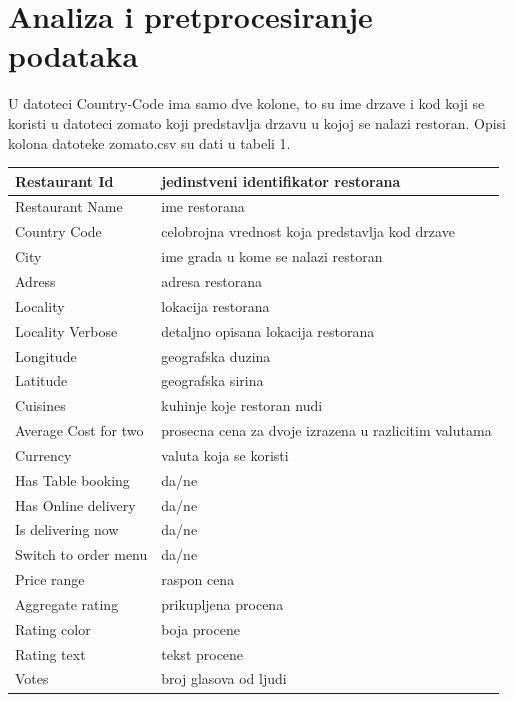 \documentclass[11pt]{article} %
\begin{document}
\section{Analiza i pretprocesiranje podataka}
U datoteci Country-Code ima samo dve kolone, to su ime drzave i kod koji se koristi u datoteci zomato koji predstavlja drzavu u kojoj se nalazi restoran. Opisi kolona datoteke zomato.csv su dati u tabeli 1.
\newline\newline
\begin{tabular}{|l|l|}
\hline
Restaurant Id & jedinstveni identifikator restorana \\
\hline
Restaurant Name & ime restorana \\
\hline
Country Code & celobrojna vrednost koja predstavlja kod drzave \\
\hline
City & ime grada u kome se nalazi restoran \\
\hline
Adress & adresa restorana \\
\hline
Locality & lokacija restorana \\
\hline
Locality Verbose & detaljno opisana lokacija restorana\\
\hline
Longitude & geografska duzina \\
\hline
Latitude & geografska sirina \\
\hline
Cuisines & kuhinje koje restoran nudi \\
\hline
Average Cost for two & prosecna cena za dvoje izrazena u razlicitim valutama \\
\hline
Currency & valuta koja se koristi \\
\hline
Has Table booking & da/ne \\
\hline
Has Online delivery & da/ne \\
\hline
Is delivering now & da/ne \\
\hline
Switch to order menu & da/ne \\
\hline
Price range & raspon cena \\
\hline
Aggregate rating & prikupljena procena \\
\hline
Rating color & boja procene \\
\hline
Rating text & tekst procene \\
\hline
Votes & broj glasova od ljudi \\
\hline
\end{tabular}
\end{document}
